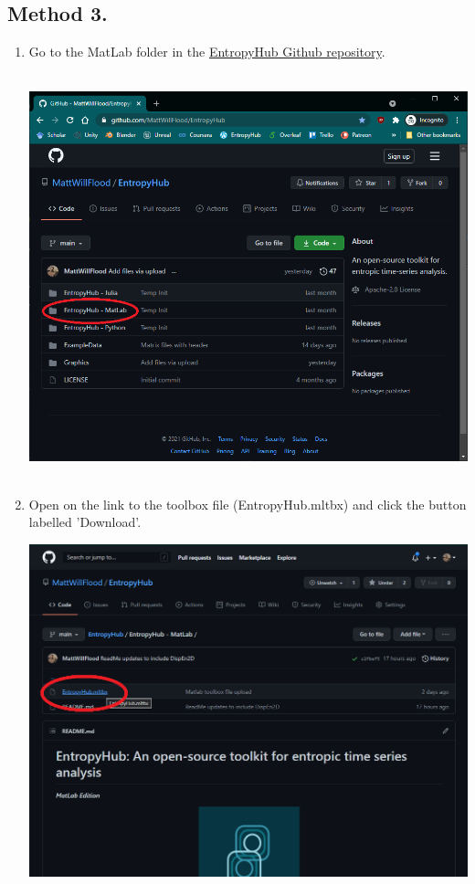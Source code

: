 \documentclass[12pt, a4paper, titlepage, openany]{book}
\begin{document}
\subsection*{\normalsize Method 3.}
\begin{enumerate}
\item	Go to the MatLab folder in the \href{https://github.com/MattWillFlood/EntropyHub/tree/main/EntropyHub\%20-\%20MatLab}{EntropyHub  Github repository}.\\ \ \\
\begin{minipage}[h]{\linewidth}
          \centering
          \includegraphics[scale=.6]{MATLAB_README4.png}\\ \ \\
          \medskip
\end{minipage}
\item	Open on the link to the toolbox file (EntropyHub.mltbx) and click the button labelled 'Download'.\\
\begin{minipage}[h]{\linewidth}
          \centering
          \includegraphics[scale=.5]{matscreen8.png}\\ \ \\	

\end{minipage}
\end{enumerate}
\end{document}
